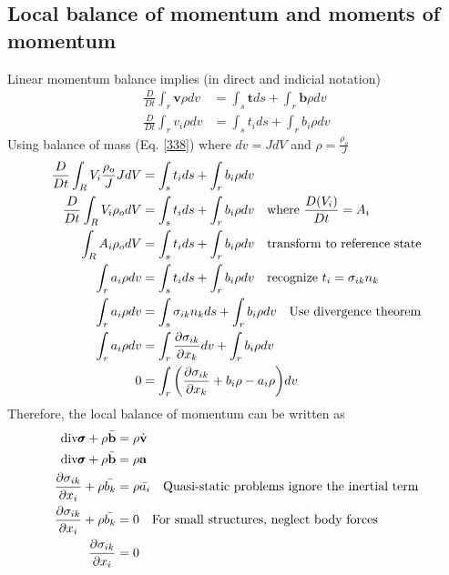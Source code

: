 \documentclass[12pt,3p]{article}
\numberwithin{equation}{section}
\begin{document}
\subsection{Local balance of momentum and moments of momentum}
Linear momentum balance implies (in direct and indicial notation)
\begin{align*}
\frac{D}{Dt} \int_r \mathbf{v} \rho dv &= \int_{s} \mathbf{t} ds + \int_{r} \mathbf{b} \rho dv \\
\frac{D}{Dt} \int_r v_i \rho dv &= \int_{s} t_i ds + \int_{r} b_i \rho dv
\end{align*}
Using balance of mass (Eq. \ref{338}) where $dv = J dV$ and $\rho = \frac{\rho_o}{J}$
\begin{align*}
\frac{D}{Dt} \int_{R} V_i \frac{\rho_o}{J} J dV &= \int_{s} t_i ds + \int_{r} b_i \rho dv \\
\frac{D}{Dt} \int_{R} V_i \rho_o dV &= \int_{s} t_i ds + \int_{r} b_i \rho dv \quad \text{where } \frac{D(V_i)}{Dt} = A_i \\
\int_{R} A_i \rho_o dV &= \int_{s} t_i ds + \int_{r} b_i \rho dv \quad \text{transform to reference state} \\
\int_{r} a_i \rho dv &= \int_{s} t_i ds + \int_{r} b_i \rho dv \quad \text{recognize } t_i = \sigma_{ik} n_k \\
\int_{r} a_i \rho dv &= \int_{s} \sigma_{ik} n_k ds + \int_{r} b_i \rho dv \quad \text{Use divergence theorem} \\
\int_{r} a_i \rho dv &= \int_{r} \pdv{\sigma_{ik}}{x_k} dv + \int_{r} b_i \rho dv \\
0 &= \int_{r} \bigg( \pdv{\sigma_{ik}}{x_k} + b_i \rho - a_i \rho  \bigg) dv
\end{align*}
Therefore, the local balance of momentum can be written as
\begin{align}\label{339}
\begin{split}
\text{div} \pmb{\sigma} + \rho \bar{\textbf{b}} &= \rho \dot{\textbf{v}} \\
\text{div} \pmb{\sigma} + \rho \bar{\textbf{b}} &= \rho \textbf{a} \\
\pdv{\sigma_{ik}}{x_i} + \rho \bar{b_k} &= \rho \bar{a_i} \quad \text{Quasi-static problems ignore the inertial term} \\
\pdv{\sigma_{ik}}{x_i} + \rho \bar{b_k} &= 0 \quad \text{For small structures, neglect body forces} \\
\pdv{\sigma_{ik}}{x_i} &= 0 
\end{split}
\end{align}
\end{document}
